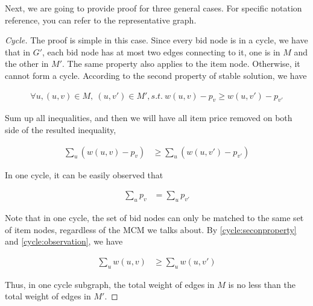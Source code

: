 \documentclass[11pt,a4paper]{article}
\begin{document}
Next, we are going to provide proof for three general cases. For specific
notation reference, you can refer to the representative graph.

\begin{proof}[Cycle]

    The proof is simple in this case. Since every bid node is in a cycle, we
    have that in $G'$, each bid node has at most two edges connecting to it,
    one is in $M$ and the other in $M'$. The same property also applies to the
    item node. Otherwise, it cannot form a cycle.
    According to the second property of stable solution, we have 

    \begin{align}
        \forall u, (u,v) \in M,\ (u, v') \in M', s.t.\  w(u, v) - p_v \geq w(u, v') - p_{v'}
    \end{align}

    Sum up all inequalities, and then we will have all item price removed on
    both side of the resulted inequality, 

    \begin{align} \label{cycle:seconproperty}
        \sum_{u} ( w(u, v) - p_v) & \geq \sum_{u} ( w(u, v') - p_{v'} ) 
    \end{align}
    
    In one cycle, it can be easily observed that 

    \begin{align} \label{cycle:observation}
        \sum_{u} p_v & = \sum_{u}  p_{v'}
    \end{align}

    Note that in one cycle, the set of bid nodes can only be matched to the
    same set of item nodes, regardless of the MCM we talks about. By \eqref{cycle:seconproperty}
    and \eqref{cycle:observation}, we have

    \begin{align}
        \sum_{u} w(u, v) & \geq \sum_{u}  w(u, v')
    \end{align}

    Thus, in one cycle subgraph, the total weight of edges in $M$ is no less
    than the total weight of edges in $M'$.

\end{proof}
\end{document}
